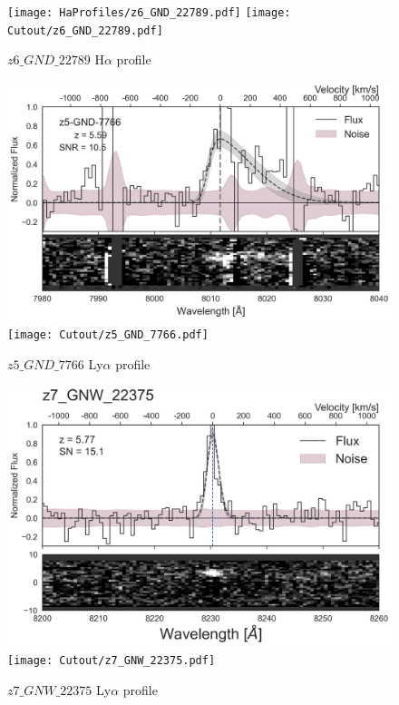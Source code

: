\documentclass[12pt,english]{article}
\begin{document}
\clearpage
\begin{figure}
\begin{center}\texttt{[image: HaProfiles/z6\_GND\_22789.pdf]}
\texttt{[image: Cutout/z6\_GND\_22789.pdf]}
\caption{$z6\_GND\_22789$ H$\alpha$ profile}
\end{center}
\end{figure}
\clearpage
\begin{figure}
\begin{center}\includegraphics[width=12cm, trim=0.1cm 0cm 0cm -1cm]{LyaProfiles/z5_GND_7766.png}
\texttt{[image: Cutout/z5\_GND\_7766.pdf]}
\caption{$z5\_GND\_7766$ Ly$\alpha$ profile}
\end{center}
\end{figure}
\clearpage
\begin{figure}
\begin{center}\includegraphics[width=12cm, trim=0.1cm 0cm 0cm -1cm]{LyaProfiles/z7_GNW_22375.png}
\texttt{[image: Cutout/z7\_GNW\_22375.pdf]}
\caption{$z7\_GNW\_22375$ Ly$\alpha$ profile}
\end{center}
\end{figure}
\end{document}
